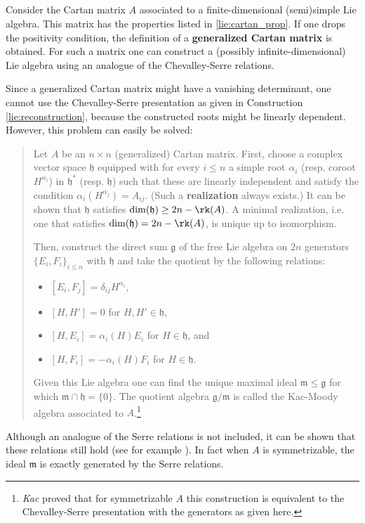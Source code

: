 \subsection{}

    \begin{construct}\label{lie:kac_moody}
        Consider the Cartan matrix $A$ associated to a finite-dimensional (semi)simple Lie algebra. This matrix has the properties listed in \ref{lie:cartan_prop}. If one drops the positivity condition, the definition of a \textbf{generalized Cartan matrix} is obtained. For such a matrix one can construct a (possibly infinite-dimensional) Lie algebra using an analogue of the Chevalley-Serre relations.

        Since a generalized Cartan matrix might have a vanishing determinant, one cannot use the Chevalley-Serre presentation as given in Construction \ref{lie:reconstruction}, because the constructed roots might be linearly dependent. However, this problem can easily be solved:
        \begin{quote}
            Let $A$ be an $n\times n$ (generalized) Cartan matrix. First, choose a complex vector space $\mathfrak{h}$ equipped with for every $i\leq n$ a simple root $\alpha_i$ (resp. coroot $H^{\alpha_i}$) in $\mathfrak{h}^*$ (resp. $\mathfrak{h}$) such that these are linearly independent and satisfy the condition $\alpha_i(H^{\alpha_j})=A_{ij}$. (Such a \textbf{realization} always exists.) It can be shown that $\mathfrak{h}$ satisfies $\dim(\mathfrak{h})\geq2n-\rk(A)$. A minimal realization, i.e. one that satisfies $\dim(\mathfrak{h})=2n-\rk(A)$, is unique up to isomorphism.

            Then, construct the direct sum $\mathfrak{g}$ of the free Lie algebra on $2n$ generators $\{E_i,F_i\}_{i\leq n}$ with $\mathfrak{h}$ and take the quotient by the following relations:
            \begin{itemize}
                \item $[E_i,F_j] = \delta_{ij}H^{\alpha_i}$,
                \item $[H,H']=0$ for $H,H'\in\mathfrak{h}$,
                \item $[H,E_i]=\alpha_i(H)E_i$ for $H\in\mathfrak{h}$, and
                \item $[H,F_i]=-\alpha_i(H)F_i$ for $H\in\mathfrak{h}$.
            \end{itemize}
            Given this Lie algebra one can find the unique maximal ideal $\mathfrak{m}\leq\mathfrak{g}$ for which $\mathfrak{m}\cap\mathfrak{h}=\{0\}$. The quotient algebra $\mathfrak{g}/\mathfrak{m}$ is called the Kac-Moody algebra associated to $A$.\footnote{\textit{Kac} proved that for symmetrizable $A$ this construction is equivalent to the Chevalley-Serre presentation with the generators as given here.}
        \end{quote}
        Although an analogue of the Serre relations is not included, it can be shown that these relations still hold (see for example \cite{aminiinfinite}). In fact when $A$ is symmetrizable, the ideal $\mathfrak{m}$ is exactly generated by the Serre relations.
    \end{construct}
